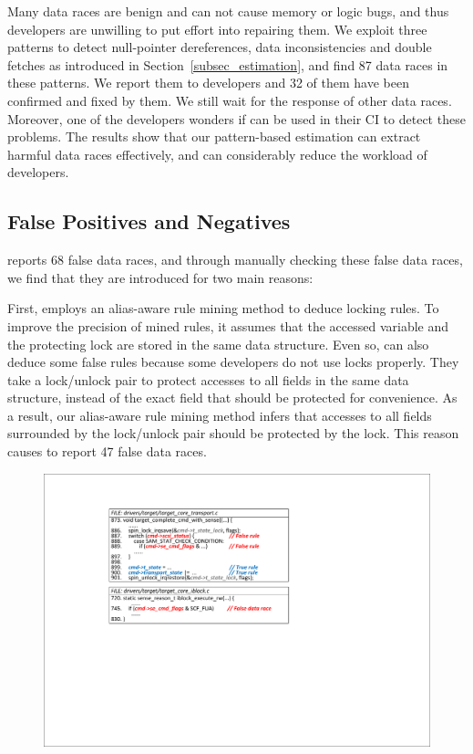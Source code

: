  Many data races are benign and can not cause memory 
or logic bugs, and thus developers are unwilling to put effort into repairing 
them. We exploit three patterns to detect null-pointer dereferences, data 
inconsistencies and double fetches as introduced in 
Section~\ref{subsec_estimation}, and find 87 data races in these patterns. We 
report them to developers and 32 of them have been confirmed and fixed by them. 
We still wait for the response of other data races. Moreover, one of the 
developers wonders if \sys can be used in their CI to detect these problems. 
The results show that our pattern-based estimation can extract harmful data 
races effectively, and can considerably reduce the workload of developers.

\subsection{False Positives and Negatives}
\label{subsec_false_pos_neg}
 \sys reports 68 false data races, and through manually 
checking these false data races, we find that they are introduced for two main 
reasons:

First, \sys employs an alias-aware rule mining method to deduce locking rules. 
To improve the precision of mined rules, it assumes that the accessed variable 
and the protecting lock are stored in the same data structure. Even so, \sys 
can also deduce some false rules because some developers do not use locks 
properly. They take a lock/unlock pair to protect accesses to all fields in the 
same data structure, instead of the exact field that should be protected for 
convenience. As a result, our alias-aware rule mining method infers that 
accesses to all fields surrounded by the lock/unlock pair should be protected 
by the lock. This reason causes \sys to report 47 false data races.

\begin{figure}[htbp]
	\centering
	\includegraphics[width=1\linewidth]{figures/fig_demo_false_rule.pdf}
	\label{fig_demo_false_rule}
\end{figure}

